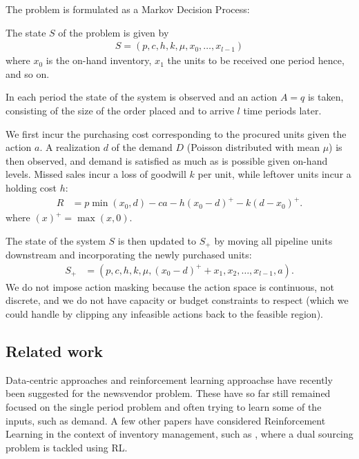 \documentclass[letterpaper]{article} %
\begin{document}
The problem is formulated as a Markov Decision Process: 
\begin{description}[style=unboxed,leftmargin=0cm]
	\item[State:] The state $S$ of the problem is given by
	\begin{align*}
	S=(p,c,h,k,\mu,x_0,\ldots,x_{l-1})
	\end{align*}
	where $x_0$ is the on-hand inventory, $x_1$ the units to be received one period hence, and so on.
	\item[Action:] In each period the state of the system is observed and an action $A=q$ is taken, consisting of the size of the order placed and to arrive $l$ time periods later.
	\item[Reward:] We first incur the purchasing cost corresponding to the procured units given the action $a$.
	A realization $d$ of the demand $D$ (Poisson distributed with mean $\mu$) is then observed, and demand is satisfied as much as is possible given on-hand levels. Missed sales incur a loss of goodwill $k$ per unit, while leftover units incur a holding cost $h$:
	\begin{align*}
	R &= p\min(x_0,d) - c a - h (x_0 - d)^+ - k (d - x_0)^+.
	\end{align*}
	where $(x)^+=\max(x,0)$.
	\item[Transition:] The state of the system $S$ is then updated to $S_+$ by moving all pipeline units downstream and incorporating the newly purchased units:
	\begin{align*}
	S_+ &= (p,c,h,k,\mu,(x_0 - d)^+ +x_1,x_2,\ldots,x_{l-1},a).
	\end{align*}
We do not impose action masking because the action space is continuous, not discrete, and we do not have capacity or budget constraints to respect (which we could handle by clipping any infeasible actions back to the feasible region).
\end{description}

\subsection{Related work}
Data-centric approaches \cite{rudin2014big} and reinforcement learning approachse \cite{oroojlooyjadid2016applying} have recently been suggested for the newsvendor problem. These have so far still remained focused on the single period problem and often trying to learn some of the inputs, such as demand. A few other papers have considered Reinforcement Learning in the context of inventory management, such as \cite{gijsbrechts2018can}, where a dual sourcing problem is tackled using RL.
\end{document}

